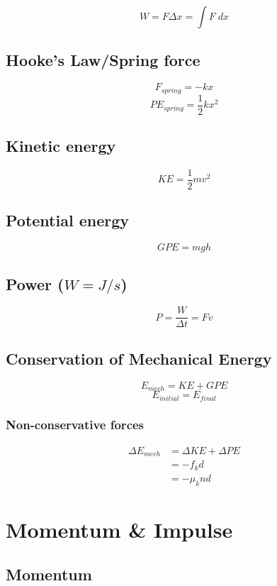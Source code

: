 \documentclass[12pt, twocolumn]{article}
\begin{document}
\begin{spacing}{1.5}
$$W = F \Delta x = \int F \; dx$$

\subsection{Hooke's Law/Spring force}

$$F_{spring} = -kx$$
$$PE_{spring} = \frac{1}{2} kx^2$$

\subsection{Kinetic energy}

$$KE = \frac{1}{2} mv^2$$

\subsection{Potential energy}

$$GPE = mgh$$

\subsection{Power ($W = J/s$)}

$$P = \frac{W}{\Delta t} = Fv$$

\subsection{Conservation of Mechanical Energy}

$$E_{mech} = KE + GPE$$
$$E_{initial} = E_{final}$$

\subsubsection{Non-conservative forces}

\begin{align*}
\Delta E_{mech} &= \Delta KE + \Delta PE \\
&= -f_k d \\
&= - \mu_k n d
\end{align*}

\section{Momentum \& Impulse}

\subsection{Momentum}


\end{spacing}
\end{document}
